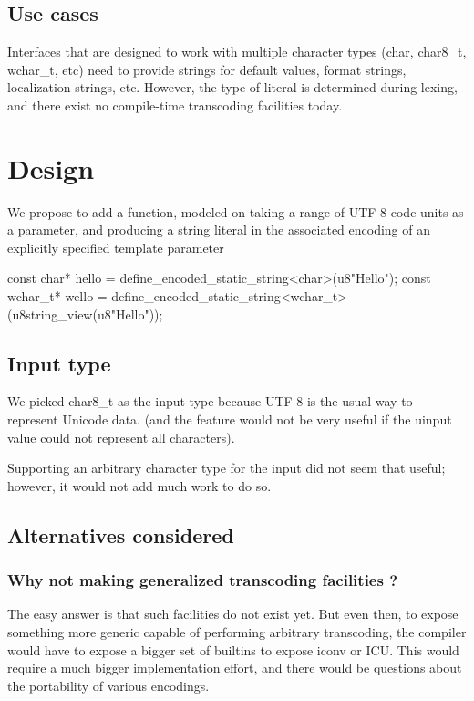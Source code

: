 \documentclass{wg21}
\begin{document}
\subsection{Use cases}

Interfaces that are designed to work with multiple character types (char, char8_t, wchar_t, etc) need to provide strings for default values,
format strings, localization strings, etc. However, the type of literal is determined during lexing, and there exist no compile-time transcoding
facilities today.

\section{Design}

We propose to add a  function, modeled on 
taking a range of UTF-8 code units as a parameter, and producing a string literal in the associated encoding of an explicitly specified
template parameter

\begin{colorblock}
const char* hello = define_encoded_static_string<char>(u8"Hello");
const wchar_t* wello = define_encoded_static_string<wchar_t>(u8string_view(u8"Hello"));
\end{colorblock}

\subsection{Input type}

We picked char8_t as the input type because UTF-8 is the usual way to represent Unicode data.
(and the feature would not be very useful if the uinput value could not represent all characters).

Supporting an arbitrary character type for the input did not seem that useful; however, it would not add much work to do so.

\subsection{Alternatives considered}

\subsubsection{Why not making generalized transcoding facilities ?}

The easy answer is that such facilities do not exist yet.
But even then, to expose something more generic capable of performing arbitrary transcoding,
the compiler would have to expose a bigger set of builtins to expose iconv or ICU.
This would require a much bigger implementation effort, and there would be questions about the portability of various encodings.
\end{document}
